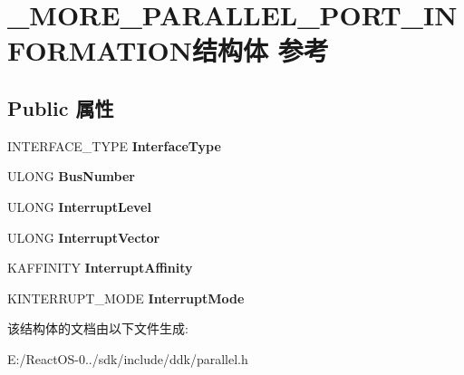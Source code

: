 \hypertarget{struct___m_o_r_e___p_a_r_a_l_l_e_l___p_o_r_t___i_n_f_o_r_m_a_t_i_o_n}{}\section{\+\_\+\+M\+O\+R\+E\+\_\+\+P\+A\+R\+A\+L\+L\+E\+L\+\_\+\+P\+O\+R\+T\+\_\+\+I\+N\+F\+O\+R\+M\+A\+T\+I\+O\+N结构体 参考}
\label{struct___m_o_r_e___p_a_r_a_l_l_e_l___p_o_r_t___i_n_f_o_r_m_a_t_i_o_n}
\subsection*{Public 属性}
\begin{DoxyCompactItemize}
\item 
\mbox{\label{struct___m_o_r_e___p_a_r_a_l_l_e_l___p_o_r_t___i_n_f_o_r_m_a_t_i_o_n_a0186453579f76d86f373961adab5c7bc}} 
I\+N\+T\+E\+R\+F\+A\+C\+E\+\_\+\+T\+Y\+PE {\bfseries Interface\+Type}
\item 
\mbox{\label{struct___m_o_r_e___p_a_r_a_l_l_e_l___p_o_r_t___i_n_f_o_r_m_a_t_i_o_n_aad241969ce2e7bb0430e95bbc3aff582}} 
U\+L\+O\+NG {\bfseries Bus\+Number}
\item 
\mbox{\label{struct___m_o_r_e___p_a_r_a_l_l_e_l___p_o_r_t___i_n_f_o_r_m_a_t_i_o_n_a7ae5bc2125951ab815924af3dba0f6bd}} 
U\+L\+O\+NG {\bfseries Interrupt\+Level}
\item 
\mbox{\label{struct___m_o_r_e___p_a_r_a_l_l_e_l___p_o_r_t___i_n_f_o_r_m_a_t_i_o_n_ab87b191542c4434298dfbae544b1a1d6}} 
U\+L\+O\+NG {\bfseries Interrupt\+Vector}
\item 
\mbox{\label{struct___m_o_r_e___p_a_r_a_l_l_e_l___p_o_r_t___i_n_f_o_r_m_a_t_i_o_n_a3d2ce2939fa736aac4248c06d688ff4b}} 
K\+A\+F\+F\+I\+N\+I\+TY {\bfseries Interrupt\+Affinity}
\item 
\mbox{\label{struct___m_o_r_e___p_a_r_a_l_l_e_l___p_o_r_t___i_n_f_o_r_m_a_t_i_o_n_af1984c66530facb7ac009a61143c3d30}} 
K\+I\+N\+T\+E\+R\+R\+U\+P\+T\+\_\+\+M\+O\+DE {\bfseries Interrupt\+Mode}
\end{DoxyCompactItemize}


该结构体的文档由以下文件生成\+:\begin{DoxyCompactItemize}
\item 
E\+:/\+React\+O\+S-\/0../sdk/include/ddk/parallel.\+h\end{DoxyCompactItemize}
